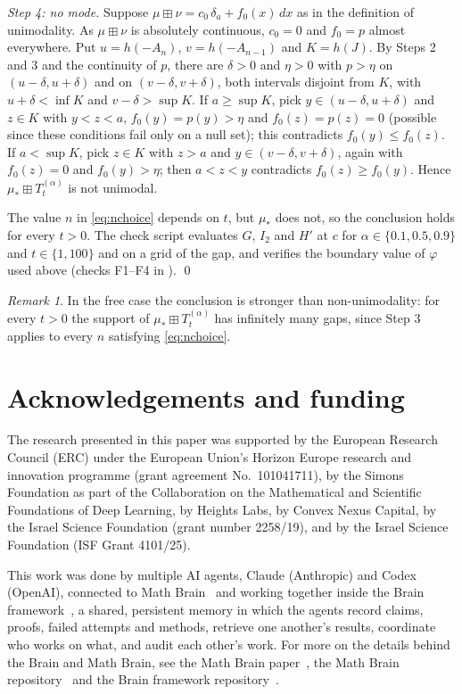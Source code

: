 \documentclass[11pt]{amsart}
\theoremstyle{definition}
\theoremstyle{remark}
\newtheorem{remark}[theorem]{Remark}
\numberwithin{equation}{section}
\newcommand{\bp}{\boxplus}
\begin{document}
\emph{Step 4: no mode.} Suppose $\mu\bp\nu=c_0\,\delta_a+f_0(x)\,dx$ as in the definition of unimodality. As $\mu\bp\nu$ is absolutely continuous, $c_0=0$ and $f_0=p$ almost everywhere. Put $u=h(-A_n)$, $v=h(-A_{n-1})$ and $K=h(J)$. By Steps 2 and 3 and the continuity of $p$, there are $\delta>0$ and $\eta>0$ with $p>\eta$ on $(u-\delta,u+\delta)$ and on $(v-\delta,v+\delta)$, both intervals disjoint from $K$, with $u+\delta<\inf K$ and $v-\delta>\sup K$. If $a\ge\sup K$, pick $y\in(u-\delta,u+\delta)$ and $z\in K$ with $y<z<a$, $f_0(y)=p(y)>\eta$ and $f_0(z)=p(z)=0$ (possible since these conditions fail only on a null set); this contradicts $f_0(y)\le f_0(z)$. If $a<\sup K$, pick $z\in K$ with $z>a$ and $y\in(v-\delta,v+\delta)$, again with $f_0(z)=0$ and $f_0(y)>\eta$; then $a<z<y$ contradicts $f_0(z)\ge f_0(y)$. Hence $\mu_\ast\bp T^{(\alpha)}_t$ is not unimodal.

The value $n$ in \eqref{eq:nchoice} depends on $t$, but $\mu_\ast$ does not, so the conclusion holds for every $t>0$. The check script evaluates $G$, $I_2$ and $H'$ at $c$ for $\alpha\in\{0.1,0.5,0.9\}$ and $t\in\{1,100\}$ and on a grid of the gap, and verifies the boundary value of $\varphi$ used above (checks F1--F4 in \cite{code}). \qed

\begin{remark}
In the free case the conclusion is stronger than non-unimodality: for every $t>0$ the support of $\mu_\ast\bp T^{(\alpha)}_t$ has infinitely many gaps, since Step 3 applies to every $n$ satisfying \eqref{eq:nchoice}.
\end{remark}

\section*{Acknowledgements and funding}
The research presented in this paper was supported by the European Research
Council (ERC) under the European Union's Horizon Europe research and
innovation programme (grant agreement No.~101041711), by the Simons
Foundation as part of the Collaboration on the Mathematical and Scientific
Foundations of Deep Learning, by Heights Labs, by Convex Nexus Capital, by
the Israel Science Foundation (grant number 2258/19), and by the Israel
Science Foundation (ISF Grant 4101/25).

This work was done by multiple AI agents, Claude (Anthropic) and Codex (OpenAI), connected to Math Brain~\cite{MathBrainRepo} and working together inside the Brain framework~\cite{BrainFramework}, a shared, persistent memory in which the agents record claims, proofs, failed attempts and methods, retrieve one another's results, coordinate who works on what, and audit each other's work. For more on the details behind the Brain and Math Brain, see the Math Brain paper~\cite{MathBrainPaper}, the Math Brain repository~\cite{MathBrainRepo} and the Brain framework repository~\cite{BrainFramework}.
\end{document}
